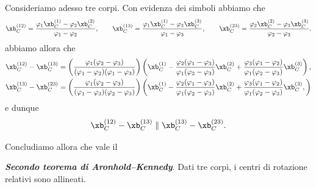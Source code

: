 Consideriamo adesso tre corpi. Con evidenza dei simboli abbiamo che 
\begin{equation}
		\xb_C^{(12)}=\frac{\varphi_1\xb_C^{(1)}-\varphi_2\xb_C^{(2)}}{\varphi_1-\varphi_2}, \qquad 
			\xb_C^{(13)}=\frac{\varphi_1\xb_C^{(1)}-\varphi_3\xb_C^{(3)}}{\varphi_1-\varphi_3}, \qquad
			\xb_C^{(23)}=\frac{\varphi_2\xb_C^{(2)}-\varphi_3\xb_C^{(3)}}{\varphi_2-\varphi_3}.
\end{equation}
abbiamo allora che 
\begin{equation}
\begin{aligned}
	&\xb_C^{(12)}-\xb_C^{(13)}=\left( \frac{\varphi_1(\varphi_2-\varphi_3)}{(\varphi_1-\varphi_2)(\varphi_1-\varphi_3)} \right)\left(\xb_C^{(1)} -\frac{\varphi_2(\varphi_1-\varphi_3)}{\varphi_1(\varphi_2-\varphi_3)}\xb_C^{(2)}+\frac{\varphi_3(\varphi_1-\varphi_2)}{\varphi_1(\varphi_2-\varphi_3)}\xb_C^{(3)}
\right),\\
&\xb_C^{(13)}-\xb_C^{(23)}=\left( \frac{\varphi_1(\varphi_2-\varphi_3)}{(\varphi_1-\varphi_3)(\varphi_2-\varphi_3)} \right)
\left(\xb_C^{(1)} -\frac{\varphi_2(\varphi_1-\varphi_3)}{\varphi_1(\varphi_2-\varphi_3)}\xb_C^{(2)}+\frac{\varphi_3(\varphi_1-\varphi_2)}{\varphi_1(\varphi_2-\varphi_3)}\xb_C^{(3)},
\right)
\end{aligned}
\end{equation}
e dunque 
\begin{equation}
\xb_C^{(12)}-\xb_C^{(13)}\parallel\xb_C^{(13)}-\xb_C^{(23)}.
\end{equation}

Concludiamo allora che vale  il 
\begin{definition}
	\textit{\textbf{Secondo teorema di Aronhold--Kennedy}}. Dati tre corpi, i centri di rotazione relativi  sono allineati.
\end{definition}

